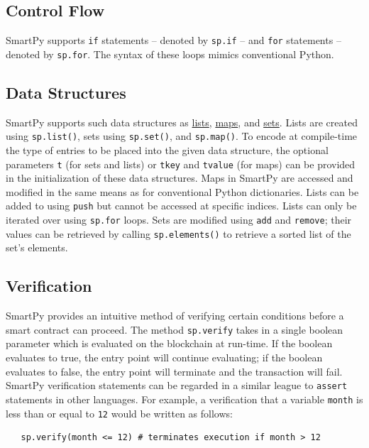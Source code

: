 \documentclass{article}
\begin{document}
\subsection{Control Flow}
\label{sec:controlflow}
SmartPy supports \lstinline!if! statements -- denoted by \lstinline!sp.if! -- and \lstinline!for! statements -- denoted by \lstinline!sp.for!. The syntax of these loops mimics conventional Python.
\subsection{Data Structures}
SmartPy supports such data structures as \href{https://smartpy.io/demo/reference.html#_lists}{lists}, \href{https://smartpy.io/demo/reference.html#_maps_and_big_maps}{maps}, and \href{https://smartpy.io/demo/reference.html#_sets}{sets}. Lists are created using \lstinline!sp.list()!, sets using \lstinline!sp.set()!, and \lstinline!sp.map()!. To encode at compile-time the type of entries to be placed into the given data structure, the optional parameters \lstinline!t! (for sets and lists) or \lstinline!tkey! and \lstinline!tvalue! (for maps) can be provided in the initialization of these data structures. Maps in SmartPy are accessed and modified in the same means as for conventional Python dictionaries. Lists can be added to using \lstinline!push! but cannot be accessed at specific indices. Lists can only be iterated over using \lstinline!sp.for! loops. Sets are modified using \lstinline!add! and \lstinline!remove!; their values can be retrieved by calling \lstinline!sp.elements()! to retrieve a sorted list of the set's elements.
\subsection{Verification}
SmartPy provides an intuitive method of verifying certain conditions before a smart contract can proceed. The method \lstinline!sp.verify! takes in a single boolean parameter which is evaluated on the blockchain at run-time. If the boolean evaluates to true, the entry point will continue evaluating; if the boolean evaluates to false, the entry point will terminate and the transaction will fail. SmartPy verification statements can be regarded in a similar league to \lstinline!assert! statements in other languages. For example, a verification that a variable \lstinline!month! is less than or equal to \lstinline!12! would be written as follows:
\begin{lstlisting}
   sp.verify(month <= 12) # terminates execution if month > 12
\end{lstlisting}
\end{document}
